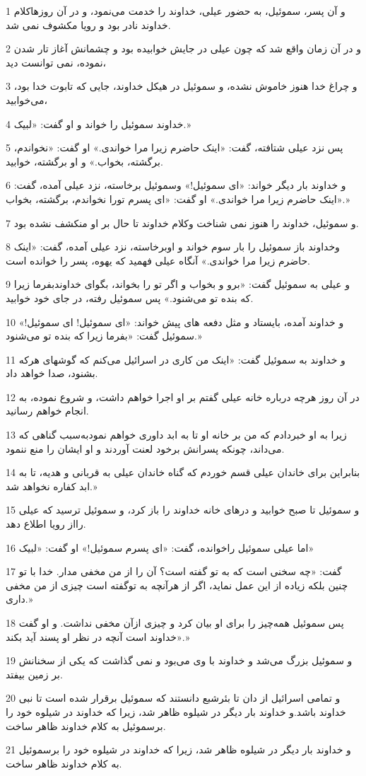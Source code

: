\par 1 و آن پسر، سموئیل، به حضور عیلی، خداوند را خدمت می‌نمود، و در آن روزهاکلام خداوند نادر بود و رویا مکشوف نمی شد.
\par 2 و در آن زمان واقع شد که چون عیلی در جایش خوابیده بود و چشمانش آغاز تار شدن نموده، نمی توانست دید،
\par 3 و چراغ خدا هنوز خاموش نشده، و سموئیل در هیکل خداوند، جایی که تابوت خدا بود، می‌خوابید،
\par 4 خداوند سموئیل را خواند و او گفت: «لبیک.»
\par 5 پس نزد عیلی شتافته، گفت: «اینک حاضرم زیرا مرا خواندی.» او گفت: «نخواندم، برگشته، بخواب.» و او برگشته، خوابید.
\par 6 و خداوند بار دیگر خواند: «ای سموئیل!» وسموئیل برخاسته، نزد عیلی آمده، گفت: «اینک حاضرم زیرا مرا خواندی.» او گفت: «ای پسرم تورا نخواندم، برگشته، بخواب.»
\par 7 و سموئیل، خداوند را هنوز نمی شناخت وکلام خداوند تا حال بر او منکشف نشده بود.
\par 8 وخداوند باز سموئیل را بار سوم خواند و اوبرخاسته، نزد عیلی آمده، گفت: «اینک حاضرم زیرا مرا خواندی.» آنگاه عیلی فهمید که یهوه، پسر را خوانده است.
\par 9 و عیلی به سموئیل گفت: «برو و بخواب و اگر تو را بخواند، بگو‌ای خداوندبفرما زیرا که بنده تو می‌شنود.» پس سموئیل رفته، در جای خود خوابید.
\par 10 و خداوند آمده، بایستاد و مثل دفعه های پیش خواند: «ای سموئیل! ای سموئیل!» سموئیل گفت: «بفرما زیرا که بنده تو می‌شنود.»
\par 11 و خداوند به سموئیل گفت: «اینک من کاری در اسرائیل می‌کنم که گوشهای هر‌که بشنود، صدا خواهد داد.
\par 12 در آن روز هر‌چه درباره خانه عیلی گفتم بر او اجرا خواهم داشت، و شروع نموده، به انجام خواهم رسانید. 
\par 13 زیرا به او خبردادم که من بر خانه او تا به ابد داوری خواهم نمودبه‌سبب گناهی که می‌داند، چونکه پسرانش برخود لعنت آوردند و او ایشان را منع ننمود.
\par 14 بنابراین برای خاندان عیلی قسم خوردم که گناه خاندان عیلی به قربانی و هدیه، تا به ابد کفاره نخواهد شد.»
\par 15 و سموئیل تا صبح خوابید و درهای خانه خداوند را باز کرد، و سموئیل ترسید که عیلی رااز رویا اطلاع دهد.
\par 16 اما عیلی سموئیل راخوانده، گفت: «ای پسرم سموئیل!» او گفت: «لبیک»
\par 17 گفت: «چه سخنی است که به تو گفته است؟ آن را از من مخفی مدار. خدا با تو چنین بلکه زیاده از این عمل نماید، اگر از هر‌آنچه به توگفته است چیزی از من مخفی داری.»
\par 18 پس سموئیل همه‌چیز را برای او بیان کرد و چیزی ازآن مخفی نداشت. و او گفت «خداوند است آنچه در نظر او پسند آید بکند.»
\par 19 و سموئیل بزرگ می‌شد و خداوند با وی می‌بود و نمی گذاشت که یکی از سخنانش بر زمین بیفتد.
\par 20 و تمامی اسرائیل از دان تا بئرشبع دانستند که سموئیل برقرار شده است تا نبی خداوند باشد.و خداوند بار دیگر در شیلوه ظاهر شد، زیرا که خداوند در شیلوه خود را برسموئیل به کلام خداوند ظاهر ساخت.
\par 21 و خداوند بار دیگر در شیلوه ظاهر شد، زیرا که خداوند در شیلوه خود را برسموئیل به کلام خداوند ظاهر ساخت.
 
